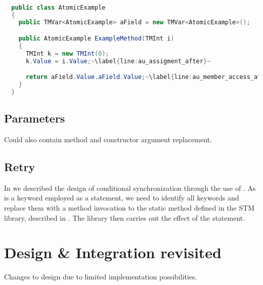 \begin{lstlisting}[label=lst:after_atomic_usage,
  caption={Usage of \bscode{atomic} Variables After Transformation},
  language=Java,  
  showspaces=false,
  showtabs=false,
  breaklines=true,
  showstringspaces=false,
  breakatwhitespace=true,
  escapechar=~,
  commentstyle=\color{greencomments},
  keywordstyle=\color{bluekeywords},
  stringstyle=\color{redstrings},
  morekeywords={atomic, retry, orelse, var, get, set}]  % Start your code-block

  public class AtomicExample
  {
    public TMVar<AtomicExample> aField = new TMVar<AtomicExample>();

    public AtomicExample ExampleMethod(TMInt i)
    {
      TMInt k = new TMInt(0);
      k.Value = i.Value;~\label{line:au_assigment_after}~

      return aField.Value.aField.Value;~\label{line:au_member_access_after}~
    }
  }
\end{lstlisting}

\subsection{Parameters}
Could also contain method and constructor argument replacement.

\subsection{Retry}
In  we described the design of conditional synchronization through the use of . As  is a keyword employed as a statement, we need to identify all  keywords and replace them with a method invocation to the static method  defined in the \ac{STM} library, described in . The library then carries out the effect of the  statement.

\section{Design \& Integration revisited}
Changes to design due to limited implementation possibilities.
\worksheetend